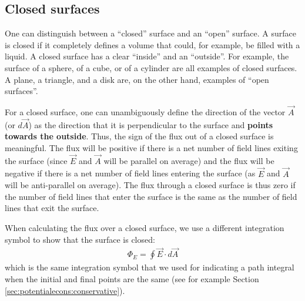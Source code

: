 \subsection{Closed surfaces}
\label{sec:gauss:closedsurfaces}
One can distinguish between a ``closed'' surface and an ``open'' surface. A surface is closed if it completely defines a volume that could, for example, be filled with a liquid.  A closed surface has a clear ``inside'' and an ``outside''. For example, the surface of a sphere, of a cube, or of a cylinder are all examples of closed surfaces. A plane, a triangle, and a disk are, on the other hand, examples of ``open surfaces''.

For a closed surface, one can unambiguously define the direction of the vector $\vec A$ (or $d\vec A$) as the direction that it is perpendicular to the surface and \textbf{points towards the outside}. Thus, the sign of the flux out of a closed surface is meaningful. The flux will be positive if there is a net number of field lines exiting the surface (since $\vec E$ and $\vec A$ will be parallel on average) and the flux will be negative if there is a net number of field lines entering the surface (as $\vec E$ and $\vec A$ will be anti-parallel on average). The flux through a closed surface is thus zero if the number of field lines that enter the surface is the same as the number of field lines that exit the surface.

When calculating the flux over a closed surface, we use a different integration symbol to show that the surface is closed:
\begin{align*}
\Phi_E=\oint \vec E\cdot d\vec A
\end{align*}
which is the same integration symbol that we used for indicating a path integral when the initial and final points are the same (see for example Section \ref{sec:potentialecons:conservative}).


